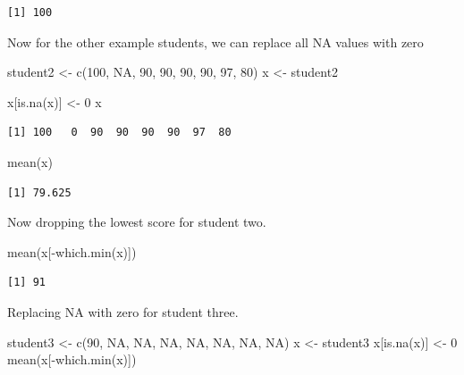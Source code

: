 \documentclass[
  letterpaper,
  DIV=11,
  numbers=noendperiod]{scrartcl}
\newenvironment{Shaded}{\begin{snugshade}}{\end{snugshade}}
\newcommand{\ConstantTok}[1]{\textcolor[rgb]{0.56,0.35,0.01}{#1}}
\newcommand{\DecValTok}[1]{\textcolor[rgb]{0.68,0.00,0.00}{#1}}
\newcommand{\FunctionTok}[1]{\textcolor[rgb]{0.28,0.35,0.67}{#1}}
\newcommand{\NormalTok}[1]{\textcolor[rgb]{0.00,0.23,0.31}{#1}}
\newcommand{\OtherTok}[1]{\textcolor[rgb]{0.00,0.23,0.31}{#1}}
\newcommand{\SpecialCharTok}[1]{\textcolor[rgb]{0.37,0.37,0.37}{#1}}
\begin{document}
\begin{verbatim}
[1] 100
\end{verbatim}

Now for the other example students, we can replace all NA values with
zero

\begin{Shaded}
\begin{Highlighting}[]
\NormalTok{student2 }\OtherTok{\textless{}{-}} \FunctionTok{c}\NormalTok{(}\DecValTok{100}\NormalTok{, }\ConstantTok{NA}\NormalTok{, }\DecValTok{90}\NormalTok{, }\DecValTok{90}\NormalTok{, }\DecValTok{90}\NormalTok{, }\DecValTok{90}\NormalTok{, }\DecValTok{97}\NormalTok{, }\DecValTok{80}\NormalTok{)}
\NormalTok{x }\OtherTok{\textless{}{-}}\NormalTok{ student2}

\NormalTok{x[}\FunctionTok{is.na}\NormalTok{(x)] }\OtherTok{\textless{}{-}} \DecValTok{0}
\NormalTok{x}
\end{Highlighting}
\end{Shaded}

\begin{verbatim}
[1] 100   0  90  90  90  90  97  80
\end{verbatim}

\begin{Shaded}
\begin{Highlighting}[]
\FunctionTok{mean}\NormalTok{(x)}
\end{Highlighting}
\end{Shaded}

\begin{verbatim}
[1] 79.625
\end{verbatim}

Now dropping the lowest score for student two.

\begin{Shaded}
\begin{Highlighting}[]
\FunctionTok{mean}\NormalTok{(x[}\SpecialCharTok{{-}}\FunctionTok{which.min}\NormalTok{(x)])}
\end{Highlighting}
\end{Shaded}

\begin{verbatim}
[1] 91
\end{verbatim}

Replacing NA with zero for student three.

\begin{Shaded}
\begin{Highlighting}[]
\NormalTok{student3 }\OtherTok{\textless{}{-}} \FunctionTok{c}\NormalTok{(}\DecValTok{90}\NormalTok{, }\ConstantTok{NA}\NormalTok{, }\ConstantTok{NA}\NormalTok{, }\ConstantTok{NA}\NormalTok{, }\ConstantTok{NA}\NormalTok{, }\ConstantTok{NA}\NormalTok{, }\ConstantTok{NA}\NormalTok{, }\ConstantTok{NA}\NormalTok{)}
\NormalTok{x }\OtherTok{\textless{}{-}}\NormalTok{ student3}
\NormalTok{x[}\FunctionTok{is.na}\NormalTok{(x)] }\OtherTok{\textless{}{-}} \DecValTok{0}
\FunctionTok{mean}\NormalTok{(x[}\SpecialCharTok{{-}}\FunctionTok{which.min}\NormalTok{(x)])}
\end{Highlighting}
\end{Shaded}
\end{document}
